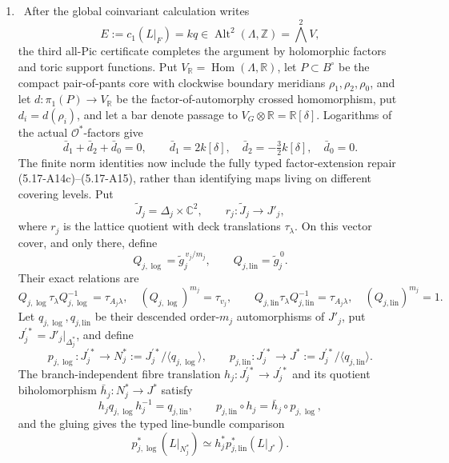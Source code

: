 \begin{enumerate}[leftmargin=1.8em]
\item \Verified\ After the global coinvariant calculation writes
\[
 E:=c_1(L|_F)=kq\in\operatorname{Alt}^2(\Lambda,\mathbb Z)
       =\bigwedge^2V,
\]
the third all-Pic certificate completes the argument by holomorphic factors
and toric support functions.  Put
\(V_{\mathbb R}=\operatorname{Hom}(\Lambda,\mathbb R)\), let
\(P\subset B^\circ\) be the compact pair-of-pants core with clockwise
boundary meridians \(\rho_1,\rho_2,\rho_0\), and let
\(d:\pi_1(P)\to V_{\mathbb R}\) be the factor-of-automorphy crossed
homomorphism, put \(d_i=d(\rho_i)\), and let a bar denote passage to
\(V_G\otimes\mathbb R=\mathbb R[\delta]\).  Logarithms of the actual
\(\mathcal O^*\)-factors give
\[
 \bar d_1+\bar d_2+\bar d_0=0,\qquad
 \bar d_1=2k[\delta],\quad
 \bar d_2=-\tfrac32k[\delta],\quad
 \bar d_0=0.
\]
The finite norm identities now include the fully typed factor-extension
repair (5.17-A14c)--(5.17-A15), rather than identifying maps living on
different covering levels.  Put
\[
 \widetilde J_j=\Delta_j\times\mathbb C^2,
 \qquad r_j:\widetilde J_j\longrightarrow J'_j,
\]
where \(r_j\) is the lattice quotient with deck translations
\(\tau_\lambda\).  On this vector cover, and only there, define
\[
 Q_{j,\log}=\widetilde g_j^{\,v_j/m_j},\qquad
 Q_{j,\mathrm{lin}}=\widetilde g_j^{\,0}.
\]
Their exact relations are
\[
 Q_{j,\log}\tau_\lambda Q_{j,\log}^{-1}=\tau_{A_j\lambda},
 \quad (Q_{j,\log})^{m_j}=\tau_{v_j},
 \qquad
 Q_{j,\mathrm{lin}}\tau_\lambda Q_{j,\mathrm{lin}}^{-1}
 =\tau_{A_j\lambda},
 \quad (Q_{j,\mathrm{lin}})^{m_j}=1.
\]
Let \(q_{j,\log},q_{j,\mathrm{lin}}\) be their descended order-\(m_j\)
automorphisms of \(J'_j\), put
\(J_j^{\prime *}=J'_j|_{\Delta_j^*}\), and define
\[
 p_{j,\log}:J_j^{\prime *}\to
 N_j^*:=J_j^{\prime *}/\langle q_{j,\log}\rangle,
 \qquad
 p_{j,\mathrm{lin}}:J_j^{\prime *}\to
 J^*:=J_j^{\prime *}/\langle q_{j,\mathrm{lin}}\rangle.
\]
The branch-independent fibre translation
\(h_j:J_j^{\prime *}\to J_j^{\prime *}\) and
its quotient biholomorphism \(\bar h_j:N_j^*\to J^*\) satisfy
\[
 h_jq_{j,\log}h_j^{-1}=q_{j,\mathrm{lin}},
 \qquad p_{j,\mathrm{lin}}\circ h_j=\bar h_j\circ p_{j,\log},
\]
and the gluing gives the typed line-bundle comparison
\[
 p_{j,\log}^*(L|_{N_j^*})
 \simeq h_j^*p_{j,\mathrm{lin}}^*(L|_{J^*}).
\]


\end{enumerate}
